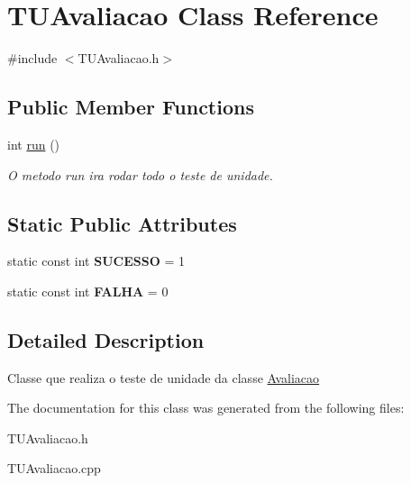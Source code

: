 \hypertarget{classTUAvaliacao}{}\section{T\+U\+Avaliacao Class Reference}
\label{classTUAvaliacao}


{\ttfamily \#include $<$T\+U\+Avaliacao.\+h$>$}

\subsection*{Public Member Functions}
\begin{DoxyCompactItemize}
\item 
int \hyperlink{classTUAvaliacao_aed2383c33ca301a41c3c364af6e5a4af}{run} ()\hypertarget{classTUAvaliacao_aed2383c33ca301a41c3c364af6e5a4af}{}\label{classTUAvaliacao_aed2383c33ca301a41c3c364af6e5a4af}

\begin{DoxyCompactList}\small\item\em O metodo run ira rodar todo o teste de unidade. \end{DoxyCompactList}\end{DoxyCompactItemize}
\subsection*{Static Public Attributes}
\begin{DoxyCompactItemize}
\item 
static const int {\bfseries S\+U\+C\+E\+S\+SO} = 1\hypertarget{classTUAvaliacao_a697dce874d58847a37766795210fc360}{}\label{classTUAvaliacao_a697dce874d58847a37766795210fc360}

\item 
static const int {\bfseries F\+A\+L\+HA} = 0\hypertarget{classTUAvaliacao_ae55d06cff56296d44ca12e76fd82ca1b}{}\label{classTUAvaliacao_ae55d06cff56296d44ca12e76fd82ca1b}

\end{DoxyCompactItemize}


\subsection{Detailed Description}
Classe que realiza o teste de unidade da classe \hyperlink{classAvaliacao}{Avaliacao} 

The documentation for this class was generated from the following files\+:\begin{DoxyCompactItemize}
\item 
T\+U\+Avaliacao.\+h\item 
T\+U\+Avaliacao.\+cpp\end{DoxyCompactItemize}
